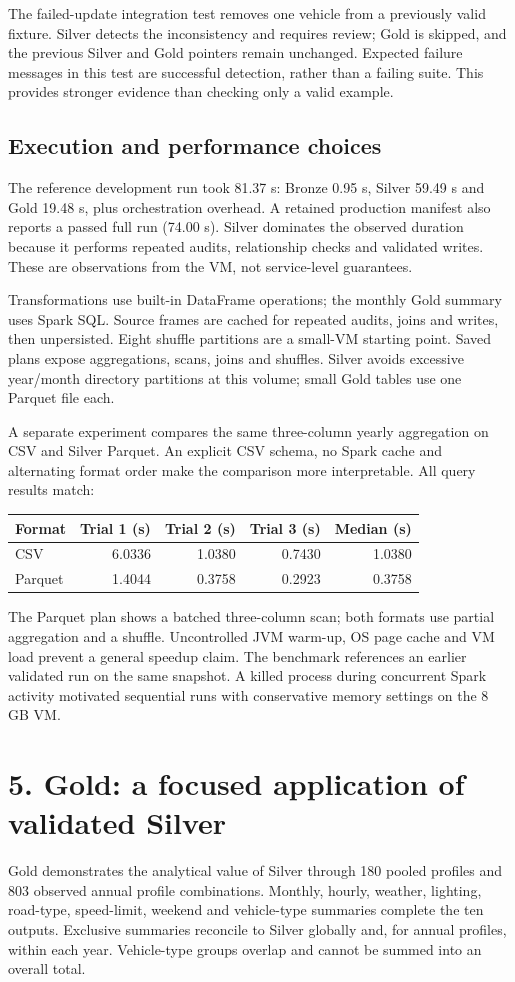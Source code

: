 \documentclass[10pt,a4paper]{article}
\newcommand{\heading}[1]{\section*{\color{accent}#1}}
\newcommand{\subheading}[1]{\subsection*{#1}}
\begin{document}
The failed-update integration test removes one vehicle from a previously valid fixture. Silver detects the inconsistency and requires review; Gold is skipped, and the previous Silver and Gold pointers remain unchanged. Expected failure messages in this test are successful detection, rather than a failing suite. This provides stronger evidence than checking only a valid example.

\subheading{Execution and performance choices}
The reference development run took 81.37 s: Bronze 0.95 s, Silver 59.49 s and Gold 19.48 s, plus orchestration overhead. A retained production manifest also reports a passed full run (74.00 s). Silver dominates the observed duration because it performs repeated audits, relationship checks and validated writes. These are observations from the VM, not service-level guarantees.

Transformations use built-in DataFrame operations; the monthly Gold summary uses Spark SQL. Source frames are cached for repeated audits, joins and writes, then unpersisted. Eight shuffle partitions are a small-VM starting point. Saved plans expose aggregations, scans, joins and shuffles. Silver avoids excessive year/month directory partitions at this volume; small Gold tables use one Parquet file each.

A separate experiment compares the same three-column yearly aggregation on CSV and Silver Parquet. An explicit CSV schema, no Spark cache and alternating format order make the comparison more interpretable. All query results match:
\begin{center}
\begin{tabular}{lrrrr}
\toprule Format & Trial 1 (s) & Trial 2 (s) & Trial 3 (s) & Median (s)\\\midrule
CSV & 6.0336 & 1.0380 & 0.7430 & 1.0380\\
Parquet & 1.4044 & 0.3758 & 0.2923 & 0.3758\\\bottomrule
\end{tabular}\end{center}
The Parquet plan shows a batched three-column scan; both formats use partial aggregation and a shuffle. Uncontrolled JVM warm-up, OS page cache and VM load prevent a general speedup claim. The benchmark references an earlier validated run on the same snapshot. A killed process during concurrent Spark activity motivated sequential runs with conservative memory settings on the 8 GB VM.

\newpage
\heading{5. Gold: a focused application of validated Silver}
Gold demonstrates the analytical value of Silver through 180 pooled profiles and 803 observed annual profile combinations. Monthly, hourly, weather, lighting, road-type, speed-limit, weekend and vehicle-type summaries complete the ten outputs. Exclusive summaries reconcile to Silver globally and, for annual profiles, within each year. Vehicle-type groups overlap and cannot be summed into an overall total.
\end{document}
